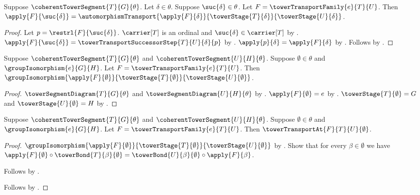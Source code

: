\begin{proposition}\label{tower_transport_family_successor_equation}
    Suppose $\coherentTowerSegment{T}{G}{\theta}$.
    Let $\delta\in\theta$.
    Suppose $\suc{\delta}\in\theta$.
    Let $F=\towerTransportFamily{e}{T}{U}$.
    Then $\apply{F}{\suc{\delta}}=
        \automorphismTransport{\apply{F}{\delta}}
            {\towerStage{T}{\delta}}{\towerStage{U}{\delta}}$.
\end{proposition}
\begin{proof}
    Let $p=\restrl{F}{\suc{\delta}}$.
    $\carrier[T]$ is an ordinal and
        $\suc{\delta}\in\carrier[T]$ by
        .
    $\apply{F}{\suc{\delta}}=
        \towerTransportSuccessorStep{T}{U}{\delta}{p}$ by
        .
    $\apply{p}{\delta}=\apply{F}{\delta}$ by
        .
    Follows by .
\end{proof}

\begin{proposition}\label{tower_transport_zero_component}
    Suppose $\coherentTowerSegment{T}{G}{\theta}$ and
        $\coherentTowerSegment{U}{H}{\theta}$.
    Suppose $\emptyset\in\theta$ and
        $\groupIsomorphism{e}{G}{H}$.
    Let $F=\towerTransportFamily{e}{T}{U}$.
    Then $\groupIsomorphism{\apply{F}{\emptyset}}
        {\towerStage{T}{\emptyset}}{\towerStage{U}{\emptyset}}$.
\end{proposition}
\begin{proof}
    $\towerSegmentDiagram{T}{G}{\theta}$ and
        $\towerSegmentDiagram{U}{H}{\theta}$ by
        .
    $\apply{F}{\emptyset}=e$ by
        .
    $\towerStage{T}{\emptyset}=G$ and
        $\towerStage{U}{\emptyset}=H$ by
        .
\end{proof}

\begin{proposition}\label{tower_transport_at_zero}
    Suppose $\coherentTowerSegment{T}{G}{\theta}$ and
        $\coherentTowerSegment{U}{H}{\theta}$.
    Suppose $\emptyset\in\theta$ and
        $\groupIsomorphism{e}{G}{H}$.
    Let $F=\towerTransportFamily{e}{T}{U}$.
    Then $\towerTransportAt{F}{T}{U}{\emptyset}$.
\end{proposition}
\begin{proof}
    $\groupIsomorphism{\apply{F}{\emptyset}}
        {\towerStage{T}{\emptyset}}{\towerStage{U}{\emptyset}}$ by
        .
    Show that for every $\beta\in\emptyset$ we have
        $\apply{F}{\emptyset}\circ
            \towerBond{T}{\beta}{\emptyset}=
        \towerBond{U}{\beta}{\emptyset}\circ\apply{F}{\beta}$.
    \begin{subproof}
        Follows by .
    \end{subproof}
    Follows by .
\end{proof}

